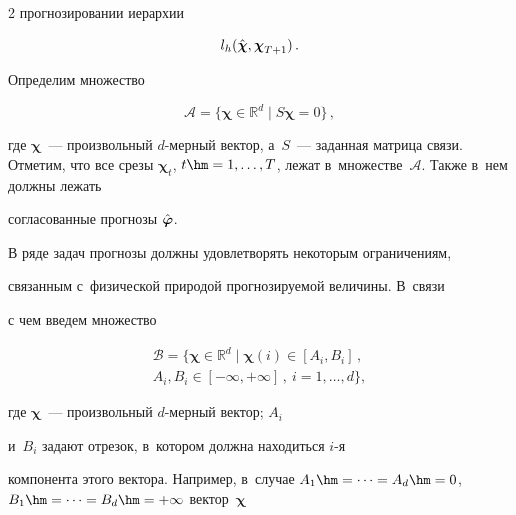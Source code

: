 \begin{multicols}{2}
прогнозировании иерархии

\begin{equation}

\label{eq:HierarchyLoss}

    l_h(\hchi, \boldsymbol{\chi}_{T+1})\,.

\end{equation}



Определим множество

\begin{equation}

\label{eq:SetReconciled}

    \mathcal{A} = \{ \boldsymbol{\chi} \in \mathbb{R}^d \mid S \boldsymbol{\chi} = 0 \}\,,

\end{equation}

где $\boldsymbol{\chi}$~--- произвольный $d$-мерный вектор, а~$S$~--- заданная матрица связи. Отметим, что все срезы $\boldsymbol{\chi}_t$, $t \hm=

1, \ldots, T$, лежат в~множестве~$\mathcal{A}$. Также в~нем должны лежать

согласованные прогнозы $\hat{\boldsymbol{\varphi}}$.



В ряде задач прогнозы должны удовлетворять некоторым ограничениям,

связанным с~физической природой прогнозируемой величины. В~связи

с чем введем множество

\begin{multline}

\label{eq:SetPhysicsConstraint}

    \mathcal{B} = \{ \boldsymbol{\chi} \in \mathbb{R}^d \mid \boldsymbol{\chi}(i)

    \in [A_i, B_i]\,,\\

     A_i, B_i \in [-\infty, +\infty]\,,\ i = 1, \ldots, d

    \},

\end{multline}

где $\boldsymbol{\chi}$~--- произвольный $d$-мер\-ный вектор; $A_i$

и~$B_i$ задают отрезок, в~котором должна находиться \mbox{$i$-я}

компонента этого вектора. Например, в~случае $A_1 \hm= \cdots = A_d \hm=

0$, $B_1 \hm= \cdots = B_d \hm= +\infty$ вектор~$\boldsymbol{\chi}$


\end{multicols}
